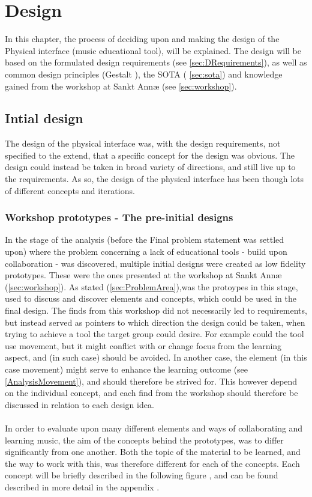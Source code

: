 \chapter{Design}

In this chapter, the process of deciding upon and making the design of the Physical interface (music educational tool), will be explained. The design will be based on the formulated design requirements (see \autoref{sec:DRequirements}), as well as common design principles (Gestalt \cite{gestalt}), the SOTA ( \autoref{sec:sota}) and knowledge gained from the workshop at Sankt Annæ (see \autoref{sec:workshop}). 


\section{Intial design}
The design of the physical interface was, with the design requirements, not specified to the extend, that a specific concept for the design was obvious. The design could instead be taken in broad variety of directions, and still live up to the requirements. As so, the design of the physical interface has been though lots of different concepts and iterations. 

\subsection {Workshop prototypes - The pre-initial designs}
In the stage of the analysis (before the Final problem statement was settled upon) where the problem concerning a lack of educational tools - build upon collaboration - was discovered, multiple initial designs were created as low fidelity prototypes. These were the ones presented at the workshop at Sankt Annæ (\autoref{sec:workshop}). As stated (\autoref{sec:ProblemArea}),was the protoypes in this stage, used to discuss and discover elements and concepts, which could be used in the final design. The finds from this workshop did not necessarily led to requirements, but instead served as pointers to which direction the design could be taken, when trying to achieve a tool the target group could desire. For example could the tool use movement, but it might conflict with or change focus from the learning aspect, and (in such case) should be avoided. In another case, the element (in this case movement) might serve to enhance the learning outcome (see \autoref{AnalysisMovement}), and should therefore be strived for. This however depend on the individual concept, and each find from the workshop should therefore be discussed in relation to each design idea. 
\\\\
In order to evaluate upon many different elements and ways of collaborating and learning music, the aim of the concepts behind the prototypes, was to differ significantly from one another. Both the topic of the material to be learned, and the way to work with this, was therefore different for each of the concepts. Each concept will be briefly described in the following figure , and can be found described in more detail in the appendix . 


